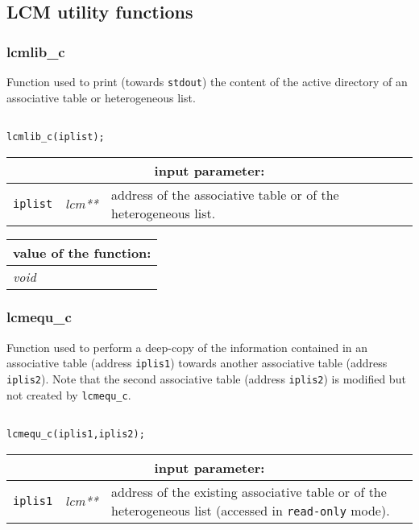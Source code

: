 \vspace{0.8cm}

\subsection{LCM utility functions}

\subsubsection{lcmlib\_c}

Function used to print (towards {\tt stdout}) the content of the active directory of an associative table or heterogeneous list.

\begin{verbatim}

lcmlib_c(iplist);
\end{verbatim}

\noindent
\begin{tabular}{|p{1.5cm}|p{2cm}|p{11cm}|}
\hline
\multicolumn{3}{|c|}{\bf input parameter:} \\
\hline
{\tt iplist} & {\it lcm**} & address of the associative table or of the heterogeneous list. \\
\hline
\end{tabular}

\vskip 0.8cm

\noindent
\begin{tabular}{|p{4.0cm}|p{11cm}|}
\hline
\multicolumn{2}{|c|}{\bf value of the function:} \\
\hline
{\it void} &  \\
\hline
\end{tabular}

\subsubsection{lcmequ\_c}

Function used to perform a deep-copy of the information contained in an associative table (address {\tt iplis1}) 
towards another associative table (address {\tt iplis2}). Note that the second associative table (address {\tt iplis2}) is modified
but not created by {\tt lcmequ\_c}.

\begin{verbatim}

lcmequ_c(iplis1,iplis2);
\end{verbatim}

\noindent
\begin{tabular}{|p{1.5cm}|p{2cm}|p{11cm}|}
\hline
\multicolumn{3}{|c|}{\bf input parameter:} \\
\hline
{\tt iplis1} & {\it lcm**} & address of the existing associative table or of the heterogeneous list
                                    (accessed in {\tt read-only} mode). \\
\hline
\end{tabular}

